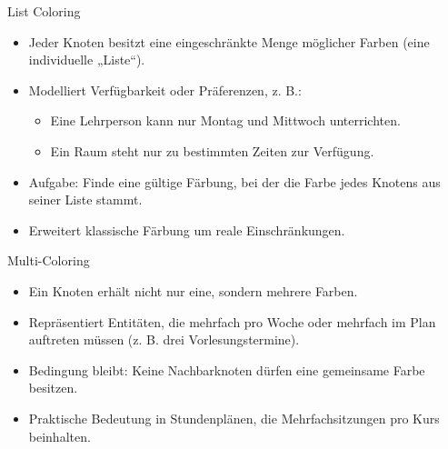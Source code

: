 \documentclass[10pt]{beamer}
\begin{document}
\begin{frame}{List Coloring}
    \small
    \begin{itemize}
        \item Jeder Knoten besitzt eine eingeschränkte Menge möglicher Farben (eine individuelle „Liste“).
        \item Modelliert Verfügbarkeit oder Präferenzen, z. B.:
        \begin{itemize}
            \item Eine Lehrperson kann nur Montag und Mittwoch unterrichten.
            \item Ein Raum steht nur zu bestimmten Zeiten zur Verfügung.
        \end{itemize}
        \item Aufgabe: Finde eine gültige Färbung, bei der die Farbe jedes Knotens aus seiner Liste stammt.
        \item Erweitert klassische Färbung um reale Einschränkungen.
    \end{itemize}
\end{frame}

\begin{frame}{Multi-Coloring}
    \small
    \begin{itemize}
        \item Ein Knoten erhält nicht nur eine, sondern mehrere Farben.
        \item Repräsentiert Entitäten, die mehrfach pro Woche oder mehrfach im Plan auftreten müssen (z. B. drei Vorlesungstermine).
        \item Bedingung bleibt: Keine Nachbarknoten dürfen eine gemeinsame Farbe besitzen.
        \item Praktische Bedeutung in Stundenplänen, die Mehrfachsitzungen pro Kurs beinhalten.
    \end{itemize}
\end{frame}
\end{document}
